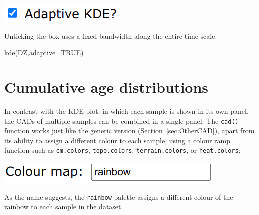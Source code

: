 \begin{refsection}
\begin{enumerate}
\noindent\begin{minipage}[t]{.2\linewidth}
\strut\vspace*{-\baselineskip}\newline
\includegraphics[width=\linewidth]{../figures/detritalKDEadaptive.png}
\end{minipage}
\begin{minipage}[t]{.8\linewidth}
Unticking the box uses a fixed bandwidth along the entire time scale.
\end{minipage}

\begin{console}
kde(DZ,adaptive=TRUE)
\end{console}

\end{enumerate}

\section{Cumulative age distributions}

In contrast with the KDE plot, in which each sample is shown in its
own panel, the CADs of multiple samples can be combined in a single
panel. The \texttt{cad()} function works just like the generic version
(Section~\ref{sec:OtherCAD}), apart from its ability to assign a
different colour to each sample, using a colour ramp function such as
\texttt{cm.colors}, \texttt{topo.colors}, \texttt{terrain.colors}, or
\texttt{heat.colors}:\\

\noindent\begin{minipage}[t]{.32\linewidth}
\strut\vspace*{-\baselineskip}\newline
\includegraphics[width=\linewidth]{../figures/detritalCADcol.png}
\end{minipage}
\begin{minipage}[t]{.68\linewidth}
  As the name suggests, the \texttt{rainbow} palette assigns a
  different colour of the rainbow to each sample in the dataset.
\end{minipage}


\end{refsection}
